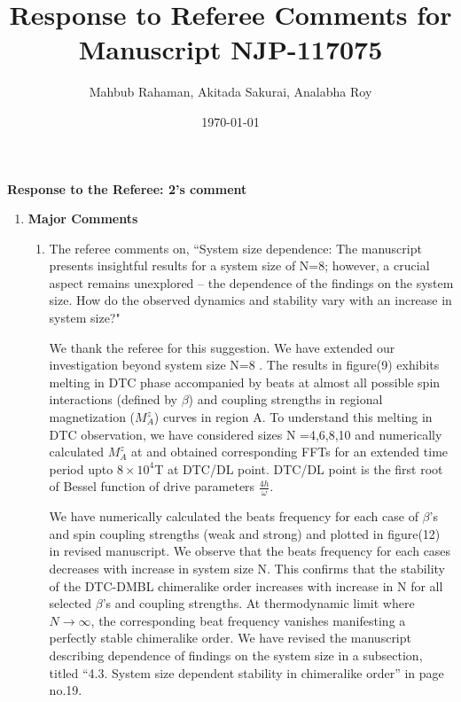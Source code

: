 \documentclass[aps,prb,reprint,showpacs,floatfix,superscriptaddress, onecolumn, nofootinbib, 10pt]{revtex4-2}
\newcommand{\response}[1]{{\color{black}#1}} %
\newcommand{\comment}[1]{{\color{blue}#1}} %
\begin{document}

\title{Response to Referee Comments for Manuscript NJP-117075}
\author{Mahbub Rahaman, Akitada Sakurai, Analabha Roy}
\date{\today}

\maketitle

\vspace{1em}

\noindent \textbf{Response to the Referee: 2's comment}
\begin{enumerate}
	\item {\bf Major Comments}
	\begin{enumerate}
		\item The referee comments on, \comment{``System size dependence: The manuscript presents insightful results for a system size
				of N=8; however, a crucial aspect remains unexplored – the dependence of the
				findings on the system size. How do the observed dynamics and stability vary with an
				increase in system size?"}\\
		
		\response{
			We thank the referee for this suggestion. We have extended our investigation beyond system size N=8 . The results in figure(9) exhibits melting in DTC phase accompanied by beats at almost all possible spin interactions (defined by $\beta$) and coupling strengths in regional magnetization ($M^z_A$) curves in region A. To understand this melting in DTC observation, we have considered sizes N =4,6,8,10 and numerically calculated $M^z_A$ at and obtained corresponding FFTs for an extended time period upto $8 \times 10^4$T at DTC/DL point.  DTC/DL point is the first root of Bessel function of drive parameters $\frac{4h}{\omega}$. 
			
			We have numerically calculated the beats frequency for each case of $\beta$'s and spin coupling strengths (weak and strong) and plotted in figure(12) in revised manuscript. We observe that the beats frequency for each cases decreases with increase in system size N. This confirms that the stability of the DTC-DMBL chimeralike order increases with increase in N for all selected $\beta$'s and coupling strengths. At thermodynamic limit where $N\rightarrow\infty$, the corresponding beat frequency vanishes manifesting a perfectly stable chimeralike order. We have revised the manuscript describing dependence of findings on the system size in a subsection, titled ``4.3. System size dependent stability in chimeralike order'' in page no.19.
		}
	

\end{enumerate}
\end{enumerate}
\end{document}
